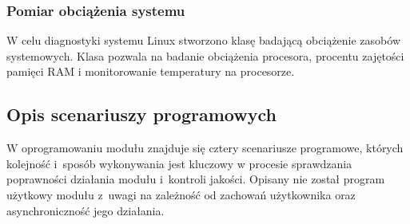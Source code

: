 \documentclass[12pt, eng, twoside, openany, final]{mgr}
\begin{document}
                \subsubsection{Pomiar obciążenia systemu}
                W celu diagnostyki systemu Linux stworzono klasę badającą obciążenie zasobów systemowych. Klasa pozwala na badanie obciążenia procesora, procentu zajętości pamięci RAM i monitorowanie temperatury na procesorze.
                
                \newpage
                
                \subsection{Opis scenariuszy programowych}
                W oprogramowaniu modułu znajduje się cztery scenariusze programowe, których kolejność i~sposób wykonywania jest kluczowy w procesie sprawdzania poprawności działania modułu i~kontroli jakości. Opisany nie został program użytkowy modułu z~uwagi na zależność od zachowań użytkownika oraz asynchroniczność jego działania.
\end{document}
